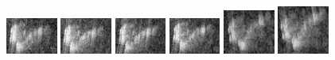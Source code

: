 \begin{figure}
    \includegraphics[width=0.15\textwidth]{chapters/images/dataset/all-class-images/hook/hook-120.jpg}
    \includegraphics[width=0.15\textwidth]{chapters/images/dataset/all-class-images/hook/hook-122.jpg}
    \includegraphics[width=0.15\textwidth]{chapters/images/dataset/all-class-images/hook/hook-125.jpg}
    \includegraphics[width=0.15\textwidth]{chapters/images/dataset/all-class-images/hook/hook-119.jpg}
    \includegraphics[width=0.15\textwidth]{chapters/images/dataset/all-class-images/hook/hook-89.jpg}
    \includegraphics[width=0.15\textwidth]{chapters/images/dataset/all-class-images/hook/hook-65.jpg}
    

\end{figure}
